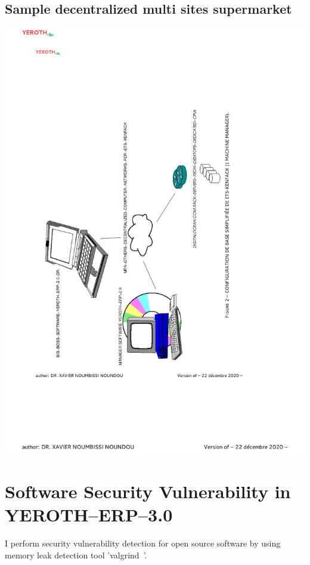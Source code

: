 \newpage

\subsection{Sample decentralized multi sites supermarket}

\begin{center}
\includegraphics[scale=0.81]{images/yeroth-sample-decentralized-multi-sites-supermarket.pdf}
\label{fig:sample-decentralized-multi-sites-supermarket}
\end{center}

\newpage

\section{Software Security Vulnerability in YEROTH--ERP--3.0}

I perform security vulnerability detection for open source
software \yerotherpblack by using memory leak detection
tool 'valgrind~\cite{conf:pldi:NethercoteS07}'.
